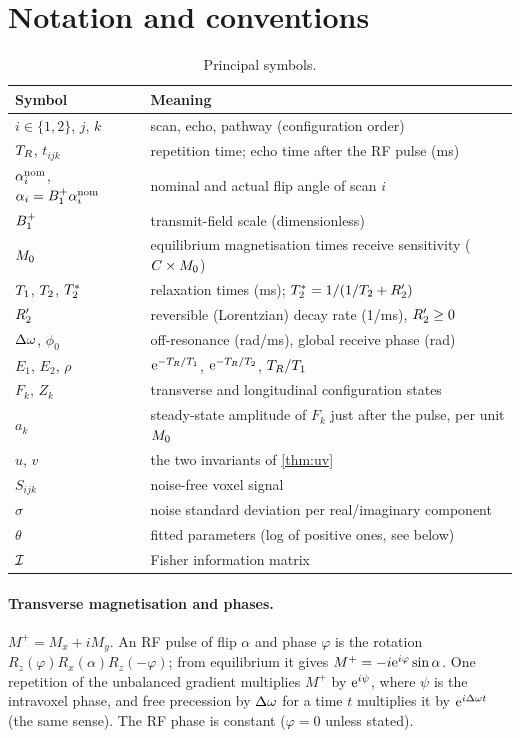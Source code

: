 \section{Notation and conventions}\label{sec:notation}

\begin{table}[!htbp]
\centering
\caption{Principal symbols.}
\label{tab:symbols}
\small
\begin{tabular}{ll}
\toprule
Symbol & Meaning\\
\midrule
$i\in\{1,2\}$, $j$, $k$ & scan, echo, pathway (configuration order)\\
$T_R$, $t_{ijk}$ & repetition time; echo time after the RF pulse (ms)\\
$\alpha_i^{\rm nom}$, $\alpha_i=B_1^{+}\alpha_i^{\rm nom}$ & nominal and actual flip angle of scan $i$\\
$B_1^{+}$ & transmit-field scale (dimensionless)\\
$M_0$ & equilibrium magnetisation times receive sensitivity ($C\times M_0$)\\
$T_1$, $T_2$, $T_2^{*}$ & relaxation times (ms); $T_2^{*}=1/(1/T_2+R_2')$\\
$R_2'$ & reversible (Lorentzian) decay rate (1/ms), $R_2'\ge0$\\
$\Delta\omega$, $\phi_0$ & off-resonance (rad/ms), global receive phase (rad)\\
$E_1$, $E_2$, $\rho$ & $\mathrm{e}^{-T_R/T_1}$, $\mathrm{e}^{-T_R/T_2}$, $T_R/T_1$\\
$F_k$, $Z_k$ & transverse and longitudinal configuration states\\
$a_k$ & steady-state amplitude of $F_k$ just after the pulse, per unit $M_0$\\
$u$, $v$ & the two invariants of \cref{thm:uv}\\
$S_{ijk}$ & noise-free voxel signal\\
$\sigma$ & noise standard deviation per real/imaginary component\\
$\theta$ & fitted parameters (log of positive ones, see below)\\
$\mathcal{I}$ & Fisher information matrix\\
\bottomrule
\end{tabular}
\end{table}

\paragraph{Transverse magnetisation and phases.} $M^+=M_x+iM_y$. An RF pulse of flip
$\alpha$ and phase $\varphi$ is the rotation $R_z(\varphi)R_x(\alpha)R_z(-\varphi)$; from
equilibrium it gives $M^+=-i\mathrm{e}^{i\varphi}\sin\alpha$. One repetition of the unbalanced gradient
multiplies $M^+$ by $\mathrm{e}^{i\psi}$, where $\psi$ is the intravoxel phase, and free precession by
$\Delta\omega$ for a time $t$ multiplies it by $\mathrm{e}^{i\Delta\omega t}$ (the same sense). The RF phase is constant
($\varphi=0$ unless stated).


